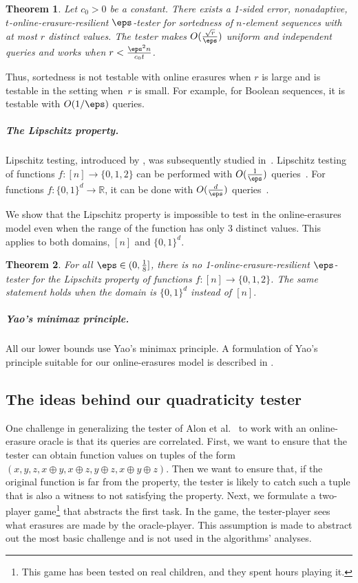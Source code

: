 \documentclass[11pt]{article}
\numberwithin{equation}{section}
\newtheorem{theorem}{Theorem}[section]
\theoremstyle{definition}
\theoremstyle{plain}
\begin{document}
\begin{theorem}\label{thm:sortedness_uniform}
Let $c_0 > 0$ be a constant.
There exists a 1-sided error, nonadaptive, $t$-online-erasure-resilient $\eps$-tester for sortedness of $n$-element sequences with at most $r$ distinct values. The tester makes $O(\frac{\sqrt{r}}{\eps})$ uniform and independent queries and works when $r<\frac{\eps^2 n}{c_0 t}$.
\end{theorem}

Thus, sortedness is not testable with online erasures when $r$ is large and is testable in the setting when~$r$ is small. For example, for Boolean sequences, it is testable with $O(1/\eps)$ queries.



\subparagraph*{The Lipschitz property.} Lipschitz testing, introduced by \cite{JhaR13}, was subsequently studied in~\cite{CS13, DixitJRT13, BermanRY14, AwasthiJMR16, ChakrabartyDJS17}. Lipschitz testing of functions %
$f:[n]\to\{0,1,2\}$ can be performed with $O(\frac 1\eps)$ queries~\cite{JhaR13}. For functions $f:\{0,1\}^d\to\mathbb{R}$, it can be done with $O(\frac d\eps)$ queries~\cite{JhaR13,CS13}. 

We show that the Lipschitz property is impossible to test in the online-erasures model even when the range of the function has only 3 distinct values. This applies to both domains, $[n]$ and $\{0,1\}^d.$
 


\begin{theorem}\label{thm:lipschitz}
    For all $\eps \in (0, \frac{1}{8}]$,
    there is no 1-online-erasure-resilient $\eps$-tester for
    the Lipschitz property of functions $f \colon [n] \to \{0,1,2\}$. 
    The same statement holds when the domain is $\{0,1\}^d$ instead of $[n].$
\end{theorem}



\subparagraph*{Yao's minimax principle.} All our lower bounds use Yao's minimax principle. A formulation of Yao's principle suitable for our online-erasures model 
is described in . 


%
\subsection{The ideas behind our quadraticity tester}\label{sec:techniques}
 One challenge in generalizing
the tester
of Alon et al.~\cite{AlonKKLR05} to work with an online-erasure oracle is that 
%
its queries are correlated. First, we want to ensure that the tester can obtain function values on tuples of the %
form
%
$(x,y,z,x\oplus y, x\oplus z, y\oplus z, x\oplus y \oplus z)$. %
Then  we  want to ensure that, if the original function is far from the property, the tester is likely to catch such a tuple that is also a witness to not satisfying the property. Next, we formulate a two-player game\footnote{This game has been tested on real children, and they spent hours playing it.} that abstracts the first task. 
In the game, the tester-player sees what erasures are made by the oracle-player. This assumption is made to abstract out the most basic challenge and is not used in the algorithms' analyses.
\end{document}
